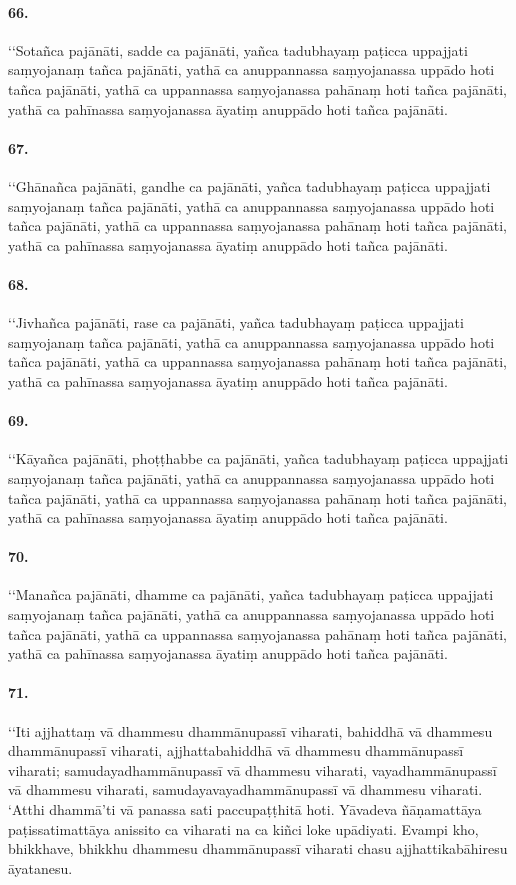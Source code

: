 \paragraph{66.} ‘‘Sotañca pajānāti, sadde ca pajānāti, yañca tadubhayaṃ paṭicca uppajjati saṃyojanaṃ tañca pajānāti, yathā ca anuppannassa saṃyojanassa uppādo hoti tañca pajānāti, yathā ca uppannassa saṃyojanassa pahānaṃ hoti tañca pajānāti, yathā ca pahīnassa saṃyojanassa āyatiṃ anuppādo hoti tañca pajānāti.

\paragraph{67.} ‘‘Ghānañca pajānāti, gandhe ca pajānāti, yañca tadubhayaṃ paṭicca uppajjati saṃyojanaṃ tañca pajānāti, yathā ca anuppannassa saṃyojanassa uppādo hoti tañca pajānāti, yathā ca uppannassa saṃyojanassa pahānaṃ hoti tañca pajānāti, yathā ca pahīnassa saṃyojanassa āyatiṃ anuppādo hoti tañca pajānāti.

\paragraph{68.} ‘‘Jivhañca pajānāti, rase ca pajānāti, yañca tadubhayaṃ paṭicca uppajjati saṃyojanaṃ tañca pajānāti, yathā ca anuppannassa saṃyojanassa uppādo hoti tañca pajānāti, yathā ca uppannassa saṃyojanassa pahānaṃ hoti tañca pajānāti, yathā ca pahīnassa saṃyojanassa āyatiṃ anuppādo hoti tañca pajānāti.

\paragraph{69.} ‘‘Kāyañca pajānāti, phoṭṭhabbe ca pajānāti, yañca tadubhayaṃ paṭicca uppajjati saṃyojanaṃ tañca pajānāti, yathā ca anuppannassa saṃyojanassa uppādo hoti tañca pajānāti, yathā ca uppannassa saṃyojanassa pahānaṃ hoti tañca pajānāti, yathā ca pahīnassa saṃyojanassa āyatiṃ anuppādo hoti tañca pajānāti.

\paragraph{70.} ‘‘Manañca pajānāti, dhamme ca pajānāti, yañca tadubhayaṃ paṭicca uppajjati saṃyojanaṃ tañca pajānāti, yathā ca anuppannassa saṃyojanassa uppādo hoti tañca pajānāti, yathā ca uppannassa saṃyojanassa pahānaṃ hoti tañca pajānāti, yathā ca pahīnassa saṃyojanassa āyatiṃ anuppādo hoti tañca pajānāti.

\paragraph{71.} ‘‘Iti ajjhattaṃ vā dhammesu dhammānupassī viharati, bahiddhā vā dhammesu dhammānupassī viharati, ajjhattabahiddhā vā dhammesu dhammānupassī viharati; samudayadhammānupassī vā dhammesu viharati, vayadhammānupassī vā dhammesu viharati, samudayavayadhammānupassī vā dhammesu viharati. ‘Atthi dhammā’ti vā panassa sati paccupaṭṭhitā hoti. Yāvadeva ñāṇamattāya paṭissatimattāya anissito ca viharati na ca kiñci loke upādiyati. Evampi kho, bhikkhave, bhikkhu dhammesu dhammānupassī viharati chasu ajjhattikabāhiresu āyatanesu.

